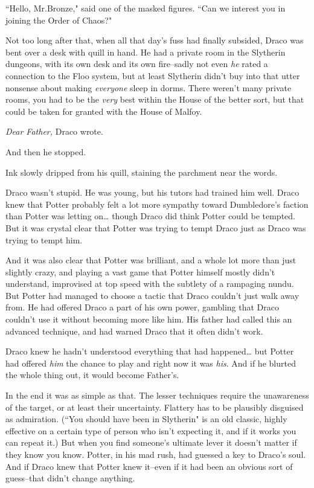 ``Hello, Mr.\?Bronze," said one of the masked figures. ``Can we interest you in joining the Order of Chaos?"


Not too long after that, when all that day's fuss had finally subsided, Draco was bent over a desk with quill in hand. He had a private room in the Slytherin dungeons, with its own desk and its own fire\---sadly not even \emph{he} rated a connection to the Floo system, but at least Slytherin didn't buy into that utter nonsense about making \emph{everyone} sleep in dorms. There weren't many private rooms, you had to be the \emph{very} best within the House of the better sort, but that could be taken for granted with the House of Malfoy.

\emph{Dear Father,} Draco wrote.

And then he stopped.

Ink slowly dripped from his quill, staining the parchment near the words.

Draco wasn't stupid. He was young, but his tutors had trained him well. Draco knew that Potter probably felt a lot more sympathy toward Dumbledore's faction than Potter was letting on{\ldots} though Draco did think Potter could be tempted. But it was crystal clear that Potter was trying to tempt Draco just as Draco was trying to tempt him.

And it was also clear that Potter was brilliant, and a whole lot more than just slightly crazy, and playing a vast game that Potter himself mostly didn't understand, improvised at top speed with the subtlety of a rampaging nundu. But Potter had managed to choose a tactic that Draco couldn't just walk away from. He had offered Draco a part of his own power, gambling that Draco couldn't use it without becoming more like him. His father had called this an advanced technique, and had warned Draco that it often didn't work.

Draco knew he hadn't understood everything that had happened{\ldots} but Potter had offered \emph{him} the chance to play and right now it was \emph{his}. And if he blurted the whole thing out, it would become Father's.

In the end it was as simple as that. The lesser techniques require the unawareness of the target, or at least their uncertainty. Flattery has to be plausibly disguised as admiration. (``You should have been in Slytherin" is an old classic, highly effective on a certain type of person who isn't expecting it, and if it works you can repeat it.) But when you find someone's ultimate lever it doesn't matter if they know you know. Potter, in his mad rush, had guessed a key to Draco's soul. And if Draco knew that Potter knew it\---even if it had been an obvious sort of guess\---that didn't change anything.


